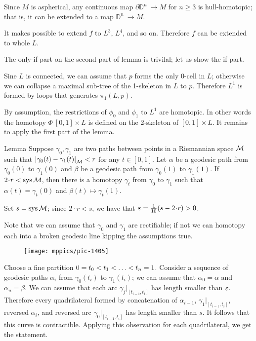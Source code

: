 Since $M$ is aspherical, any continuous map $\partial\mathbb{D}^n\:\to M$ for $n\ge 3$
is hull-homotopic;
that is, it can be extended to a map $\mathbb{D}^n\:\to M$.

It makes possible to extend $f$ to $L^3$, $L^4$, and so on.
Therefore $f$ can be extended to whole $L$.

The only-if part on the second part of lemma is trivilal; let us show the if part.

Sine $L$ is connected, we can assume that $p$ forms the only 0-cell in $L$;
otherwise we can collapse a maximal sub-tree of the 1-skeleton in $L$ to $p$.
Therefore $L^1$ is formed by loops that generates $\pi_1(L,p)$.

By assumption, the restrictions of $\phi_0$ and $\phi_1$ to $L^1$ are homotopic.
In other words the homotopy $\Phi\:[0,1]\times L$ is defined on the 2-skeleton of $[0,1]\times L$.
It remains to apply the first part of the lemma.
\qeds



\begin{thm}{Lemma}\label{lem:sys-homotopy}
Suppose $\gamma_0,\gamma_1$ are two paths between points in a Riemannian space $\mathcal{M}$ such that $\dist{\gamma_0(t)}{\gamma_1(t)}{\spc{M}}<r$ for any $t\in[0,1]$.
Let $\alpha$ be a geodesic path from $\gamma_0(0)$ to $\gamma_1(0)$ and $\beta$ be a geodesic path from $\gamma_0(1)$ to $\gamma_1(1)$. 
If $2\cdot r<\sys\spc{M}$, then there is a homotopy $\gamma_t$ from
$\gamma_0$ to $\gamma_1$ such that $\alpha(t)= \gamma_t(0)$ and $\beta(t)\mapsto \gamma_t(1)$.
\end{thm}

Set $s=\mathop{\rm sys}\nolimits\mathcal{M}$; 
since $2\cdot r<s$, we have that $\eps=\tfrac1{10}(s-2\cdot r)>0$.

Note that we can assume that $\gamma_0$ and $\gamma_1$ are rectifiable;
if not we can homotopy each into a broken geodesic line kipping the assumptions true. 

\begin{wrapfigure}{r}{34mm}
\vskip-0mm
\centering
\texttt{[image: mppics/pic-1405]}
\end{wrapfigure}

Choose a fine partition $0\z=t_0\z<t_1\z<\z\dots\z<t_n=1$.
Consider a sequence of geodesic paths $\alpha_i$ from $\gamma_0(t_i)$ to $\gamma_1(t_i)$;
we can assume that $\alpha_0=\alpha$ and $\alpha_n=\beta$.
We can assume that each arc $\gamma_j|_{[t_{i-1},t_i]}$ has length smaller than $\varepsilon$.
Therefore every quadrilateral formed by concatenation  of $\alpha_{i-1}$, $\gamma_1|_{[t_{i-1},t_i]}$, reversed $\alpha_i$, and reversed arc $\gamma_0|_{[t_{i-1},t_i]}$ has length smaller than $s$.
It follows that this curve is contractible.
Applying this observation for each quadrilateral, we get the statement.
\qeds


